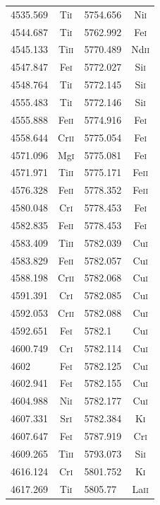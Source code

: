 \begin{longtable}[c]{|l|c|l|c|}
4535.569 & Ti\textsc{i} & 5754.656 & Ni\textsc{i}\\  
4544.687 & Ti\textsc{i} & 5762.992 & Fe\textsc{i}\\  
4545.133 & Ti\textsc{ii} & 5770.489 & Nd\textsc{ii}\\
4547.847 & Fe\textsc{i} & 5772.027 & Si\textsc{i}\\  
4548.764 & Ti\textsc{i} & 5772.145 & Si\textsc{i}\\  
4555.483 & Ti\textsc{i} & 5772.146 & Si\textsc{i}\\  
4555.888 & Fe\textsc{ii} & 5774.916 & Fe\textsc{i}\\ 
4558.644 & Cr\textsc{ii} & 5775.054 & Fe\textsc{i}\\ 
4571.096 & Mg\textsc{i} & 5775.081 & Fe\textsc{i}\\  
4571.971 & Ti\textsc{ii} & 5775.171 & Fe\textsc{ii}\\
4576.328 & Fe\textsc{ii} & 5778.352 & Fe\textsc{ii}\\
4580.048 & Cr\textsc{i} & 5778.453 & Fe\textsc{i}\\  
4582.835 & Fe\textsc{ii} & 5778.453 & Fe\textsc{i}\\ 
4583.409 & Ti\textsc{ii} & 5782.039 & Cu\textsc{i}\\ 
4583.829 & Fe\textsc{ii} & 5782.057 & Cu\textsc{i}\\ 
4588.198 & Cr\textsc{ii} & 5782.068 & Cu\textsc{i}\\ 
4591.391 & Cr\textsc{i} & 5782.085 & Cu\textsc{i}\\  
4592.053 & Cr\textsc{ii} & 5782.088 & Cu\textsc{i}\\ 
4592.651 & Fe\textsc{i} & 5782.1 & Cu\textsc{i}\\    
4600.749 & Cr\textsc{i} & 5782.114 & Cu\textsc{i}\\  
4602 & Fe\textsc{i} & 5782.125 & Cu\textsc{i}\\      
4602.941 & Fe\textsc{i} & 5782.155 & Cu\textsc{i}\\  
4604.988 & Ni\textsc{i} & 5782.177 & Cu\textsc{i}\\  
4607.331 & Sr\textsc{i} & 5782.384 & K\textsc{i}\\   
4607.647 & Fe\textsc{i} & 5787.919 & Cr\textsc{i}\\  
4609.265 & Ti\textsc{ii} & 5793.073 & Si\textsc{i}\\ 
4616.124 & Cr\textsc{i} & 5801.752 & K\textsc{i}\\   
4617.269 & Ti\textsc{i} & 5805.77 & La\textsc{ii}\\  

\end{longtable}
